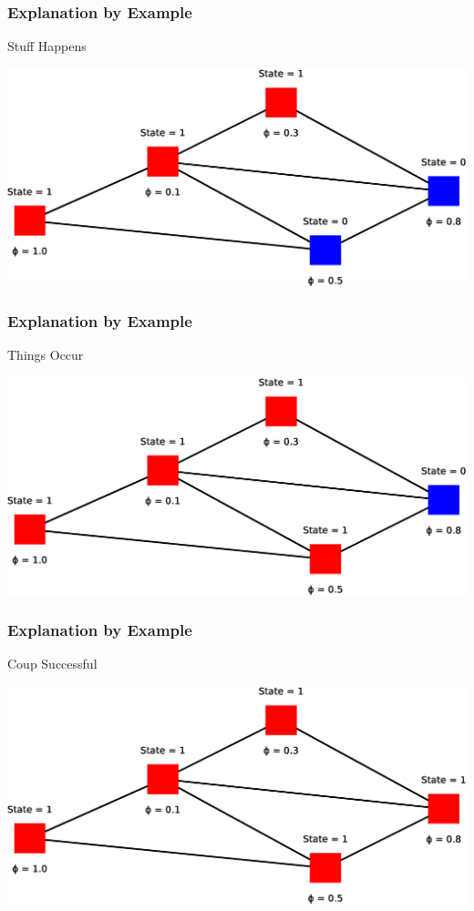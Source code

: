 \begin{frame}
    \frametitle{Explanation by Example}
    \begin{itemize}
        \gitem Stuff Happens
    \end{itemize}
    \vspace{8.8pt}
    \includegraphics[width=\textwidth]{img/model7}
    \vfill
\end{frame}

\begin{frame}
    \frametitle{Explanation by Example}
    \begin{itemize}
        \gitem Things Occur
    \end{itemize}
    \vspace{8.8pt}
    \includegraphics[width=\textwidth]{img/model8}
    \vfill
\end{frame}

\begin{frame}
    \frametitle{Explanation by Example}
    \begin{itemize}
        \gitem Coup Successful
    \end{itemize}
    \vspace{8.8pt}
    \includegraphics[width=\textwidth]{img/model9}
    \vfill
\end{frame}
